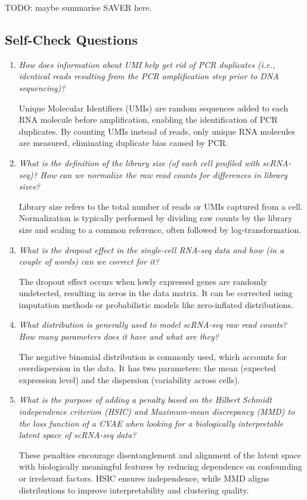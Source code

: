 \documentclass[a4paper]{article}
\begin{document}
TODO: maybe summarise SAVER here.

\subsection*{Self-Check Questions}

\begin{enumerate}

    \item \textit{How does information about UMI help get rid of PCR duplicates (i.e., identical reads resulting from the PCR amplification step prior to DNA sequencing)?}  
    
    Unique Molecular Identifiers (UMIs) are random sequences added to each RNA molecule before amplification, enabling the identification of PCR duplicates.  
    By counting UMIs instead of reads, only unique RNA molecules are measured, eliminating duplicate bias caused by PCR.  

    \item \textit{What is the definition of the library size (of each cell profiled with scRNA-seq)? How can we normalize the raw read counts for differences in library sizes?}  
    
    Library size refers to the total number of reads or UMIs captured from a cell.  
    Normalization is typically performed by dividing raw counts by the library size and scaling to a common reference, often followed by log-transformation.  

    \item \textit{What is the dropout effect in the single-cell RNA-seq data and how (in a couple of words) can we correct for it?}  
    
    The dropout effect occurs when lowly expressed genes are randomly undetected, resulting in zeros in the data matrix.  
    It can be corrected using imputation methods or probabilistic models like zero-inflated distributions.  

    \item \textit{What distribution is generally used to model scRNA-seq raw read counts? How many parameters does it have and what are they?}  
    
    The negative binomial distribution is commonly used, which accounts for overdispersion in the data.  
    It has two parameters: the mean (expected expression level) and the dispersion (variability across cells).  

    \item \textit{What is the purpose of adding a penalty based on the Hilbert Schmidt independence criterion (HSIC) and Maximum-mean discrepancy (MMD) to the loss function of a CVAE when looking for a biologically interpretable latent space of scRNA-seq data?}  
    
    These penalties encourage disentanglement and alignment of the latent space with biologically meaningful features by reducing dependence on confounding or irrelevant factors.  
    HSIC ensures independence, while MMD aligns distributions to improve interpretability and clustering quality.  

\end{enumerate}
\end{document}
